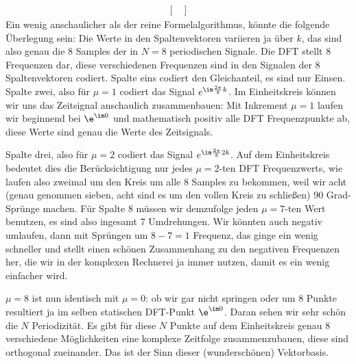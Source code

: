 \begin{Ansatz}
\begin{align}
{\begin{bmatrix}
\end{bmatrix}
}
\end{align}
%
Ein wenig anschaulicher als der reine Formelalgorithmus, könnte die folgende
Überlegung sein:
%
Die Werte in den Spaltenvektoren variieren ja über $k$,
das sind also genau die 8 Samples der in $N=8$ periodischen Signale.
Die DFT stellt 8 Frequenzen dar, diese verschiedenen Frequenzen sind in den
Signalen der 8 Spaltenvektoren codiert.
Spalte eins codiert den Gleichanteil, es sind nur Einsen.
%
Spalte zwei, also für $\mu=1$ codiert das Signal $e^{\im\frac{2\pi}{8} k}$.
Im Einheitskreis können wir uns das Zeitsignal anschaulich zusammenbauen:
Mit Inkrement $\mu=1$ laufen wir beginnend bei
$\e^{\im 0}$ und mathematisch positiv alle DFT Frequenzpunkte
ab, diese Werte sind genau die Werte des Zeitsignals.

Spalte drei, also für $\mu=2$ codiert das Signal $e^{\im\frac{2\pi}{8} 2 k}$.
Auf dem Einheitskreis bedeutet dies die Berücksichtigung nur jedes $\mu=2$-ten
DFT Frequenzwerts, wie laufen also zweimal um den Kreis um alle 8 Samples zu
bekommen, weil wir acht (genau genommen sieben, acht sind es um den vollen
Kreis zu schließen) 90 Grad-Sprünge machen.
Für Spalte 8 müssen wir demzufolge jeden $\mu=7$-ten Wert benutzen, es sind
also ingesamt 7 Umdrehungen. Wir könnten auch negativ umlaufen, dann mit
Sprüngen um $8-7=1$ Frequenz,
das ginge ein wenig schneller und stellt einen schönen Zusammenhang zu den
negativen Frequenzen her, die wir in der komplexen Rechnerei ja immer nutzen,
damit es ein wenig einfacher wird.

$\mu=8$ ist nun identisch mit $\mu=0$: ob wir gar nicht springen oder um 8
Punkte resultiert ja im selben statischen DFT-Punkt $\e^{\im 0}$. Daran sehen
wir sehr schön die $N$ Periodizität. Es gibt für diese $N$ Punkte auf dem
Einheitskreis genau 8 verschiedene Möglichkeiten eine komplexe Zeitfolge
zusammenzubauen, diese sind orthogonal zueinander.
Das ist der Sinn dieser (wunderschönen) Vektorbasis.
%
\end{Ansatz}
